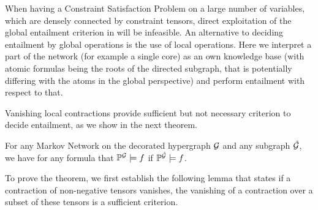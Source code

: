 \label{subsec:LocalEntailment}

When having a Constraint Satisfaction Problem on a large number of variables, which are densely connected by constraint tensors, direct exploitation of the global entailment criterion in  will be infeasible.
An alternative to deciding entailment by global operations is the use of local operations.
Here we interpret a part of the network (for example a single core) as an own knowledge base (with atomic formulas being the roots of the directed subgraph, that is potentially differing with the atoms in the global perspective) and perform entailment with respect to that.


Vanishing local contractions provide sufficient but not necessary criterion to decide entailment, as we show in the next theorem.

\begin{theorem}\label{}
	For any Markov Network on the decorated hypergraph $\mathcal{G}$ and any subgraph $\tilde{\mathcal{G}}$, we have for any formula that $\mathbb{P}^{\mathcal{G}}\models f$ if $\mathbb{P}^{\tilde{\mathcal{G}}}\models f$.
\end{theorem}

To prove the theorem, we first establish the following lemma that states if a contraction of non-negative tensors vanishes, the vanishing of a contraction over a subset of these tensors is a sufficient criterion.

